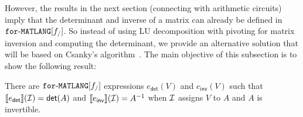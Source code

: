 However, the results
in the next section (connecting \langfor with arithmetic circuits) imply that the determinant
and inverse of a matrix can already be defined in $\texttt{for}\text{-}\texttt{MATLANG}[f_/]$. So instead of using LU decomposition with pivoting for matrix inversion and computing the determinant, we provide an alternative solution that will be based on Csanky's algorithm~\cite{Csanky76}. The main objective of this subsection is to show the following result:

\begin{proposition}\label{prop:inverse}
    There are $\texttt{for}\text{-}\texttt{MATLANG}[f_/]$ expressions $e_{\mathsf{det}}(V)$ and $e_{\mathsf{inv}}(V)$ such that
    $\llbracket e_{\mathsf{det}} \rrbracket(\mathcal{I})=\mathsf{det}(A)$ and  
    $\llbracket e_{\mathsf{inv}} \rrbracket(\mathcal{I})=A^{-1}$ when $\mathcal{I}$ assigns $V$
    to $A$ and $A$ is invertible.
\end{proposition}

